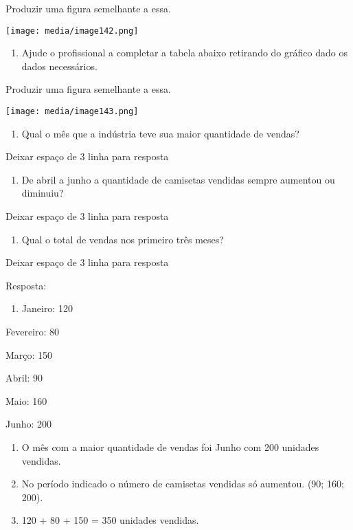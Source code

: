 Produzir uma figura semelhante a essa.

\texttt{[image: media/image142.png]}

\begin{enumerate}
\def\labelenumi{\alph{enumi})}
\item
  Ajude o profissional a completar a tabela abaixo retirando do gráfico
  dado os dados necessários.
\end{enumerate}

Produzir uma figura semelhante a essa.

\texttt{[image: media/image143.png]}

\begin{enumerate}
\def\labelenumi{\alph{enumi})}
\item
  Qual o mês que a indústria teve sua maior quantidade de vendas?
\end{enumerate}

Deixar espaço de 3 linha para resposta

\begin{enumerate}
\def\labelenumi{\alph{enumi})}
\item
  De abril a junho a quantidade de camisetas vendidas sempre aumentou ou
  diminuiu?
\end{enumerate}

Deixar espaço de 3 linha para resposta

\begin{enumerate}
\def\labelenumi{\alph{enumi})}
\item
  Qual o total de vendas nos primeiro três meses?
\end{enumerate}

Deixar espaço de 3 linha para resposta

Resposta:

\begin{enumerate}
\def\labelenumi{\alph{enumi})}
\item
  Janeiro: 120
\end{enumerate}

Fevereiro: 80

Março: 150

Abril: 90

Maio: 160

Junho: 200

\begin{enumerate}
\def\labelenumi{\alph{enumi})}
\item
  O mês com a maior quantidade de vendas foi Junho com 200 unidades
  vendidas.
\item
  No período indicado o número de camisetas vendidas só aumentou. (90;
  160; 200).
\item
  120 + 80 + 150 = 350 unidades vendidas.
\end{enumerate}

